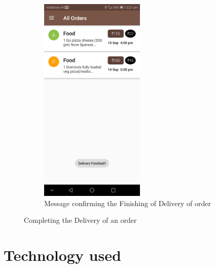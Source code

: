 \documentclass{report}
\begin{document}
\begin{figure}[h!]
\begin{subfigure}[h!]{.3\textwidth}
\includegraphics[width=5cm]{delivery_finished.jpg}
\caption{\centering \tiny Message confirming the Finishing of Delivery of order}
\end{subfigure}
\caption{\tiny Completing the Delivery of an order} 
\label{fig:NASA_Logo}
\end{figure}


\chapter{Technology used}
\end{document}
